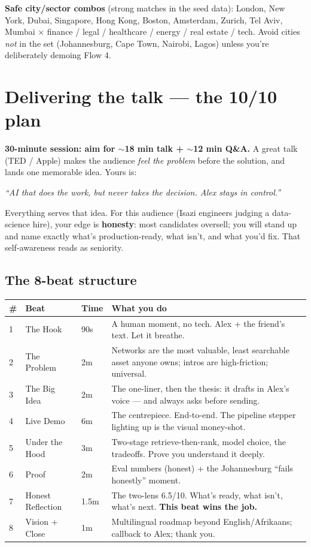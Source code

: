 \documentclass[11pt, a4paper]{article}
\begin{document}
\textbf{Safe city/sector combos} (strong matches in the seed data): London, New York, Dubai, Singapore, Hong Kong, Boston, Amsterdam, Zurich, Tel Aviv, Mumbai $\times$ finance / legal / healthcare / energy / real estate / tech. Avoid cities \emph{not} in the set (Johannesburg, Cape Town, Nairobi, Lagos) unless you're deliberately demoing Flow 4.

\section{Delivering the talk --- the 10/10 plan}
\label{sec:talk}

\textbf{30-minute session: aim for $\sim$18 min talk + $\sim$12 min Q\&A.} A great talk (TED / Apple) makes the audience \emph{feel the problem} before the solution, and lands one memorable idea. Yours is:

\begin{center}
\emph{``AI that does the work, but never takes the decision. Alex stays in control.''}
\end{center}

Everything serves that idea. For this audience (Isazi engineers judging a data-science hire), your edge is \textbf{honesty}: most candidates oversell; you will stand up and name exactly what's production-ready, what isn't, and what you'd fix. That self-awareness reads as seniority.

\subsection{The 8-beat structure}
\begin{longtable}{@{}p{0.3cm}p{2.6cm}p{1.2cm}p{10.5cm}@{}}
\toprule
\# & Beat & Time & What you do \\
\midrule
\endhead
1 & The Hook & 90s & A human moment, no tech. Alex + the friend's text. Let it breathe. \\
2 & The Problem & 2m & Networks are the most valuable, least searchable asset anyone owns; intros are high-friction; universal. \\
3 & The Big Idea & 2m & The one-liner, then the thesis: it drafts in Alex's voice --- and always asks before sending. \\
4 & Live Demo & 6m & The centrepiece. End-to-end. The pipeline stepper lighting up is the visual money-shot. \\
5 & Under the Hood & 3m & Two-stage retrieve-then-rank, model choice, the tradeoffs. Prove you understand it deeply. \\
6 & Proof & 2m & Eval numbers (honest) + the Johannesburg ``fails honestly'' moment. \\
7 & Honest Reflection & 1.5m & The two-lens 6.5/10. What's ready, what isn't, what's next. \textbf{This beat wins the job.} \\
8 & Vision + Close & 1m & Multilingual roadmap beyond English/Afrikaans; callback to Alex; thank you. \\
\bottomrule
\end{longtable}
\end{document}
